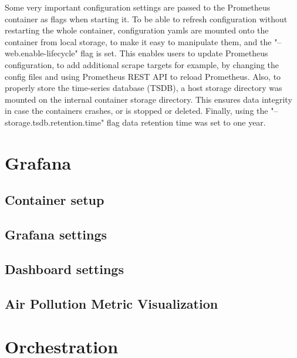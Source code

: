 Some very important configuration settings are passed to the Prometheus container as flags when starting it. To be able to refresh configuration without restarting the whole container, configuration yamls are mounted onto the container from local storage, to make it easy to manipulate them, and the "--web.enable-lifecycle" flag is set. This enables users to update Prometheus configuration, to add additional scrape targets for example, by changing the config files and using Prometheus REST API to reload Prometheus. Also, to properly store the time-series database (TSDB), a host storage directory was mounted on the internal container storage directory. This ensures data integrity in case the containers crashes, or is stopped or deleted. Finally, using the "--storage.tsdb.retention.time" flag data retention time was set to one year.

\section{Grafana}
\subsection{Container setup}
\subsection{Grafana settings}
\subsection{Dashboard settings}
\subsection{Air Pollution Metric Visualization}

\section{Orchestration}
